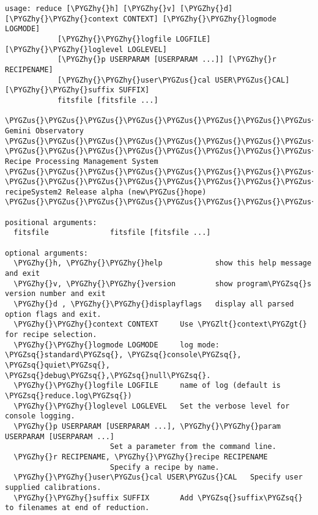 \documentclass[letterpaper,10pt,english]{sphinxmanual}
\def\PYGZus{\char`\_}
\def\PYGZlt{\char`\<}
\def\PYGZgt{\char`\>}
\def\PYGZhy{\char`\-}
\def\PYGZsq{\char`\'}
\begin{document}
\begin{Verbatim}[commandchars=\\\{\}]
usage: reduce [\PYGZhy{}h] [\PYGZhy{}v] [\PYGZhy{}d] [\PYGZhy{}\PYGZhy{}context CONTEXT] [\PYGZhy{}\PYGZhy{}logmode LOGMODE]
            [\PYGZhy{}\PYGZhy{}logfile LOGFILE] [\PYGZhy{}\PYGZhy{}loglevel LOGLEVEL]
            [\PYGZhy{}p USERPARAM [USERPARAM ...]] [\PYGZhy{}r RECIPENAME]
            [\PYGZhy{}\PYGZhy{}user\PYGZus{}cal USER\PYGZus{}CAL] [\PYGZhy{}\PYGZhy{}suffix SUFFIX]
            fitsfile [fitsfile ...]

\PYGZus{}\PYGZus{}\PYGZus{}\PYGZus{}\PYGZus{}\PYGZus{}\PYGZus{}\PYGZus{}\PYGZus{}\PYGZus{}\PYGZus{}\PYGZus{}\PYGZus{}\PYGZus{}\PYGZus{}\PYGZus{}\PYGZus{}\PYGZus{}\PYGZus{}\PYGZus{}\PYGZus{}\PYGZus{}\PYGZus{}\PYGZus{}\PYGZus{}\PYGZus{}\PYGZus{}\PYGZus{}\PYGZus{} Gemini Observatory \PYGZus{}\PYGZus{}\PYGZus{}\PYGZus{}\PYGZus{}\PYGZus{}\PYGZus{}\PYGZus{}\PYGZus{}\PYGZus{}\PYGZus{}\PYGZus{}\PYGZus{}\PYGZus{}\PYGZus{}\PYGZus{}\PYGZus{}\PYGZus{}\PYGZus{}\PYGZus{}\PYGZus{}\PYGZus{}\PYGZus{}\PYGZus{}\PYGZus{}\PYGZus{}\PYGZus{}\PYGZus{}
\PYGZus{}\PYGZus{}\PYGZus{}\PYGZus{}\PYGZus{}\PYGZus{}\PYGZus{}\PYGZus{}\PYGZus{}\PYGZus{}\PYGZus{}\PYGZus{}\PYGZus{}\PYGZus{}\PYGZus{}\PYGZus{}\PYGZus{}\PYGZus{}\PYGZus{}\PYGZus{} Recipe Processing Management System \PYGZus{}\PYGZus{}\PYGZus{}\PYGZus{}\PYGZus{}\PYGZus{}\PYGZus{}\PYGZus{}\PYGZus{}\PYGZus{}\PYGZus{}\PYGZus{}\PYGZus{}\PYGZus{}\PYGZus{}\PYGZus{}\PYGZus{}\PYGZus{}\PYGZus{}\PYGZus{}
\PYGZus{}\PYGZus{}\PYGZus{}\PYGZus{}\PYGZus{}\PYGZus{}\PYGZus{}\PYGZus{}\PYGZus{}\PYGZus{}\PYGZus{}\PYGZus{}\PYGZus{}\PYGZus{}\PYGZus{}\PYGZus{}\PYGZus{}\PYGZus{} recipeSystem2 Release alpha (new\PYGZus{}hope) \PYGZus{}\PYGZus{}\PYGZus{}\PYGZus{}\PYGZus{}\PYGZus{}\PYGZus{}\PYGZus{}\PYGZus{}\PYGZus{}\PYGZus{}\PYGZus{}\PYGZus{}\PYGZus{}\PYGZus{}\PYGZus{}\PYGZus{}\PYGZus{}

positional arguments:
  fitsfile              fitsfile [fitsfile ...]

optional arguments:
  \PYGZhy{}h, \PYGZhy{}\PYGZhy{}help            show this help message and exit
  \PYGZhy{}v, \PYGZhy{}\PYGZhy{}version         show program\PYGZsq{}s version number and exit
  \PYGZhy{}d , \PYGZhy{}\PYGZhy{}displayflags   display all parsed option flags and exit.
  \PYGZhy{}\PYGZhy{}context CONTEXT     Use \PYGZlt{}context\PYGZgt{} for recipe selection.
  \PYGZhy{}\PYGZhy{}logmode LOGMODE     log mode: \PYGZsq{}standard\PYGZsq{}, \PYGZsq{}console\PYGZsq{}, \PYGZsq{}quiet\PYGZsq{}, \PYGZsq{}debug\PYGZsq{},\PYGZsq{}null\PYGZsq{}.
  \PYGZhy{}\PYGZhy{}logfile LOGFILE     name of log (default is \PYGZsq{}reduce.log\PYGZsq{})
  \PYGZhy{}\PYGZhy{}loglevel LOGLEVEL   Set the verbose level for console logging.
  \PYGZhy{}p USERPARAM [USERPARAM ...], \PYGZhy{}\PYGZhy{}param USERPARAM [USERPARAM ...]
                        Set a parameter from the command line.
  \PYGZhy{}r RECIPENAME, \PYGZhy{}\PYGZhy{}recipe RECIPENAME
                        Specify a recipe by name.
  \PYGZhy{}\PYGZhy{}user\PYGZus{}cal USER\PYGZus{}CAL   Specify user supplied calibrations.
  \PYGZhy{}\PYGZhy{}suffix SUFFIX       Add \PYGZsq{}suffix\PYGZsq{} to filenames at end of reduction.
\end{Verbatim}
\end{document}
